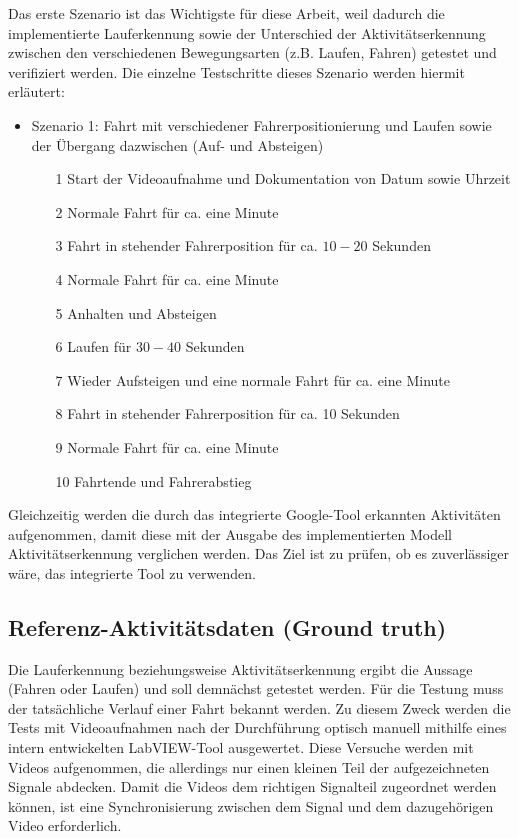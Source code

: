 Das erste Szenario ist das Wichtigste für diese Arbeit, weil dadurch die implementierte Lauferkennung sowie der Unterschied der Aktivitätserkennung zwischen den verschiedenen Bewegungsarten (z.B. Laufen, Fahren) getestet und verifiziert werden. Die einzelne Testschritte dieses Szenario werden hiermit erläutert:
\begin{itemize}
	\item Szenario 1: Fahrt mit verschiedener Fahrerpositionierung und Laufen sowie der Übergang dazwischen (Auf- und Absteigen)
	\begin{itemize}
		\item[1] Start der Videoaufnahme und Dokumentation von Datum sowie Uhrzeit
		\item[2] Normale Fahrt für ca. eine Minute
		\item[3] Fahrt in stehender Fahrerposition für ca. $10-20$ Sekunden
		\item[4] Normale Fahrt für ca. eine Minute
		\item[5] Anhalten und Absteigen
		\item[6] Laufen für $30-40$ Sekunden
		\item[7] Wieder Aufsteigen und eine normale Fahrt für ca. eine Minute
		\item[8] Fahrt in stehender Fahrerposition für ca. 10 Sekunden
		\item[9] Normale Fahrt für ca. eine Minute
		\item[10] Fahrtende und Fahrerabstieg
	\end{itemize}
\end{itemize}
Gleichzeitig werden die durch das integrierte Google-Tool erkannten Aktivitäten aufgenommen, damit diese mit der Ausgabe des implementierten Modell \glqq Aktivitäts\-erke\-nnung\grqq{} verglichen werden. Das Ziel ist zu prüfen, ob es zuverlässiger wäre, das integrierte Tool zu verwenden.


\subsection{Referenz-Aktivitätsdaten (Ground truth)}

Die Lauferkennung beziehungsweise Aktivitätserkennung ergibt die Aussage (Fahren oder Laufen) und soll demnächst getestet werden. Für die Testung muss der tatsächliche Verlauf einer Fahrt bekannt werden. Zu diesem Zweck werden die Tests mit Videoaufnahmen nach der Durchführung optisch manuell mithilfe eines intern entwickelten LabVIEW-Tool ausgewertet. Diese Versuche werden mit Videos aufgenommen, die allerdings nur einen kleinen Teil der aufgezeichneten Signale abdecken. Damit die Videos dem richtigen Signalteil zugeordnet werden können, ist eine Synchronisierung zwischen dem Signal und dem dazugehörigen Video erforderlich. 

